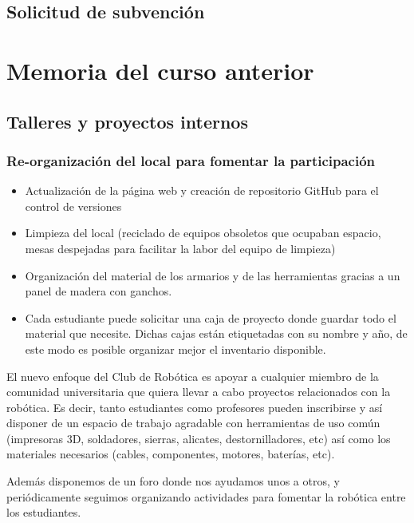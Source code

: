 \documentclass[12pt,twoside]{report}
\begin{document}
\section{Solicitud de subvención}




\chapter{Memoria del curso anterior}

\section{Talleres y proyectos internos}

\subsection{Re-organización del local para fomentar la participación}

\begin{itemize}
\item Actualización de la página web y creación de repositorio GitHub para el control de versiones
\item Limpieza del local (reciclado de equipos obsoletos que ocupaban espacio, mesas despejadas para facilitar la labor del equipo de limpieza)
\item Organización del material de los armarios y de las herramientas gracias a un panel de madera con ganchos.
\item Cada estudiante puede solicitar una caja de proyecto donde guardar todo el material que necesite. Dichas cajas están etiquetadas con su nombre y año, de este modo es posible organizar mejor el inventario disponible.
\end{itemize}

El nuevo enfoque del Club de Robótica es apoyar a cualquier miembro de la comunidad universitaria que quiera llevar a cabo proyectos relacionados con la robótica. Es decir, tanto estudiantes como profesores pueden inscribirse y así disponer de un espacio de trabajo agradable con herramientas de uso común (impresoras 3D, soldadores, sierras, alicates, destornilladores, etc) así como los materiales necesarios (cables, componentes, motores, baterías, etc).

Además disponemos de un foro donde nos ayudamos unos a otros, y periódicamente seguimos organizando actividades para fomentar la robótica entre los estudiantes.
\end{document}
